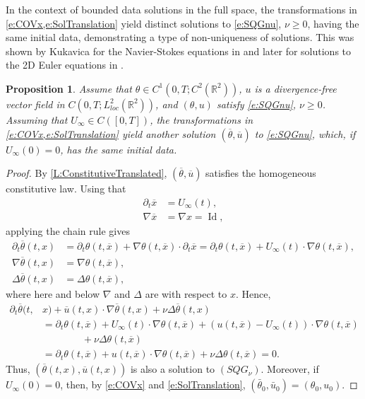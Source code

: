 \documentclass[11pt,reqno,xcolor=svgnames]{amsart}
\def\R{{\mathbb R}}
\theoremstyle{plain}
\newtheorem{prop}[theorem]{Proposition}
\theoremstyle{definition}
\theoremstyle{plain}
\theoremstyle{remark}
\newcommand{\iny}{\ensuremath{\infty}}
\newcommand{\grad}{\ensuremath{\nabla}}
\newcommand{\prt}{\ensuremath{\partial}}
\newcommand{\ol}{\overline}
\DeclareMathOperator{\Id}{Id} %
\newcommand{\ox}{{\ol{x}}}
\newcommand{\otheta}{\ol{\theta}}
\newcommand{\ou}{\ol{u}}
\begin{document}
In the context of bounded data solutions in the full space, the transformations in \cref{e:COVx,e:SolTranslation} yield distinct solutions to \cref{e:SQGnu}, $\nu \ge 0$, having the same initial data, demonstrating a type of non-uniqueness of solutions.
This was shown by Kukavica for the Navier-Stokes equations in \cite{KukavicaBoundedNS} and later for solutions to the 2D Euler equations in \cite{KBounded}. 




\begin{prop}\label{P:SQGnuNonunique}
Assume that $\theta \in C^1(0, T; C^2(\R^2))$, $u$ is a divergence-free vector field in $C(0, T; L^2_{loc}(\R^2))$, and $(\theta,u)$ satisfy \cref{e:SQGnu}, $\nu \ge 0$. Assuming that $U_\iny \in C([0, T])$, the transformations in \cref{e:COVx,e:SolTranslation} yield another solution $(\ol{\theta}, \ou)$ to \cref{e:SQGnu}, which, if $U_\iny(0) = 0$, has the same initial data.
\end{prop}
\begin{proof}
By \cref{L:ConstitutiveTranslated}, $(\ol{\theta}, \ou)$ satisfies the homogeneous constitutive law. Using that
\begin{align*}
	\prt_t \ox
		&= U_\iny(t), \\
	\grad \ox
		&= \grad x
		= \Id,
\end{align*}
applying the chain rule gives
\begin{align*}
	\prt_t \otheta(t, x)
		&= \prt_t \theta(t, \ox) + \grad \theta(t, \ox) \cdot\prt_t \ox
		= \prt_t \theta(t, \ox) + U_\iny(t)
			\cdot \grad \theta(t, \ox), \\
	\grad \otheta(t, x)
		&= \grad \theta(t, \ox), \\
	\Delta \otheta(t, x)
		&= \Delta \theta(t, \ox),
\end{align*}
where here and below $\grad$ and $\Delta$ are with respect to $x$.
Hence,
\begin{align*}
	\prt_t \otheta(t, &x)
		+ \ou(t, x) \cdot \grad \otheta(t, x) 
			+ \nu \Delta \otheta(t, x) \\
		&= \prt_t \theta(t, \ox) + U_\iny(t)
			\cdot \grad \theta(t, \ox)
			+ (u(t, \ox) - U_\iny(t)) \cdot \grad \theta(t, \ox) \\
			&\qquad\qquad
			+ \nu \Delta \theta(t, \ox) \\
		&= \prt_t \theta(t, \ox)
			+ u(t, \ox) \cdot \grad \theta(t, \ox)
			+ \nu \Delta \theta(t, \ox)
		= 0.
\end{align*}
Thus, $(\otheta(t, x),\ou(t, x))$ is also a solution to $(SQG_{\nu})$. Moreover, if $U_\iny(0) = 0$, then, by \cref{e:COVx} and \cref{e:SolTranslation}, $(\bar{\theta}_0, \bar{u}_0) = (\theta_0, u_0)$.
\end{proof}
\end{document}
